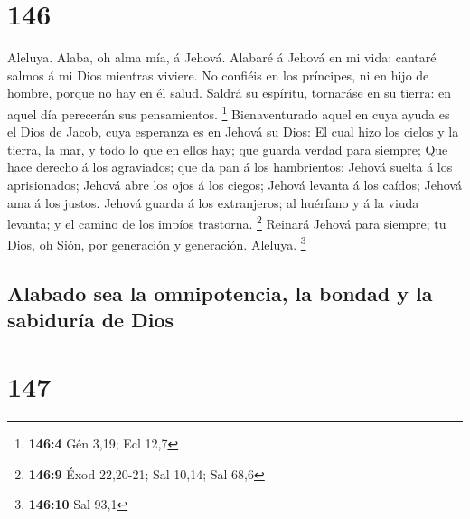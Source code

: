 \hypertarget{section-145}{%
\section{146}\label{section-145}}

 Aleluya. Alaba, oh alma mía, á Jehová.  Alabaré
á Jehová en mi vida: cantaré salmos á mi Dios mientras viviere.
 No confiéis en los príncipes, ni en hijo de hombre, porque
no hay en él salud.  Saldrá su espíritu, tornaráse en su
tierra: en aquel día perecerán sus pensamientos. \footnote{\textbf{146:4}
  Gén 3,19; Ecl 12,7}  Bienaventurado aquel en cuya ayuda es
el Dios de Jacob, cuya esperanza es en Jehová su Dios:  El
cual hizo los cielos y la tierra, la mar, y todo lo que en ellos hay;
que guarda verdad para siempre;  Que hace derecho á los
agraviados; que da pan á los hambrientos: Jehová suelta á los
aprisionados;  Jehová abre los ojos á los ciegos; Jehová
levanta á los caídos; Jehová ama á los justos.  Jehová
guarda á los extranjeros; al huérfano y á la viuda levanta; y el camino
de los impíos trastorna. \footnote{\textbf{146:9} Éxod 22,20-21; Sal
  10,14; Sal 68,6}  Reinará Jehová para siempre; tu Dios,
oh Sión, por generación y generación. Aleluya. \footnote{\textbf{146:10}
  Sal 93,1}

\hypertarget{alabado-sea-la-omnipotencia-la-bondad-y-la-sabiduruxeda-de-dios}{%
\subsection{Alabado sea la omnipotencia, la bondad y la sabiduría de
Dios}\label{alabado-sea-la-omnipotencia-la-bondad-y-la-sabiduruxeda-de-dios}}

\hypertarget{section-146}{%
\section{147}\label{section-146}}

